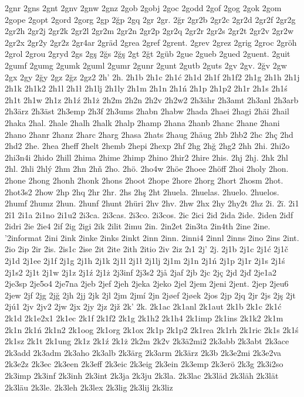 2gnr
2gns
2gnt
2gnv
2gnw
2gnz
2gob
2gobj
2goc
2godd
2gof
2gog
2gok
2gom
2gope
2gopt
2gord
2gorg
2gp
2ğp
2gq
2gr
2gr.
2ğr
2gr2b
2gr2c
2gr2d
2gr2f
2gr2g
2gr2h
2gr2j
2gr2k
2gr2l
2gr2m
2gr2n
2gr2p
2gr2q
2gr2r
2gr2s
2gr2t
2gr2v
2gr2w
2gr2x
2gr2y
2gr2z
2gr4ar
2gräd
2grea
2gref
2grent.
2grev
2grez
2grig
2groc
2gröh
2grol
2grou
2gryd
2gs
2gş
2ğs
2ğş
2gt
2ğt
2güb
2gue
2gueb
2gued
2guent.
2guit
2gumf
2gumg
2gumk
2guml
2gumr
2gunr
2gunt
2gutb
2guts
2gv
2gv.
2ğv
2gw
2gx
2gy
2ğy
2gz
2ğz
2gz2
2h'
2h.
2h1b
2h1c
2h1ć
2h1d
2h1f
2h1f2
2h1g
2h1h
2h1j
2h1k
2h1k2
2h1l
2h1ł
2h1lj
2h1ly
2h1m
2h1n
2h1ń
2h1p
2h1p2
2h1r
2h1s
2h1ś
2h1t
2h1w
2h1z
2h1ź
2h1ż
2h2m
2h2n
2h2v
2h2w2
2h3ähr
2h3amt
2h3anl
2h3arb
2h3ärz
2h3äst
2h3emp
2h3f
2h3ums
2habn
2habw
2hada
2haei
2hagi
2häi
2hail
2haka
2hal.
2hale
2halh
2halk
2halp
2hamp
2hana
2hanb
2hanc
2hane
2hani
2hano
2hanr
2hanz
2harc
2harg
2hasa
2hats
2haug
2häug
2hb
2hb2
2hc
2hç
2hd
2hd2
2he.
2hea
2heff
2helt
2hemb
2hepi
2hexp
2hf
2hg
2hğ
2hg2
2hh
2hi.
2hi2o
2hi3n4i
2hido
2hill
2hima
2hime
2himp
2hino
2hir2
2hire
2his.
2hj
2hj.
2hk
2hl
2hl.
2hli
2hlý
2hm
2hn
2hň
2ho.
2hö.
2ho4w
2höe
2hoee
2höff
2hoi
2holy
2hon.
2hone
2hong
2honh
2honk
2hons
2hoot
2hope
2hore
2horg
2hort
2hosm
2hot.
2hot3s2
2how
2hp
2hq
2hr
2hr.
2hs
2hş
2ht
2huela.
2huelas.
2huelo.
2huelos.
2humf
2humz
2hun.
2hunf
2hunt
2hüri
2hv
2hv.
2hw
2hx
2hy
2hy2t
2hz
2i.
2ï.
2i1
2î1
2i1a
2i1no
2i1u2
2i3ca.
2i3cas.
2i3co.
2i3cos.
2ic
2ici
2id
2ida
2ide.
2iden
2idf
2idri
2ie
2ie4
2if
2ig
2igi
2ik
2ilit
2imu
2in.
2in2et
2in3ta
2in4th
2ine
2ine.
'2informat
2ini
2ink
2inke
2inks
2inkt
2inn
2inn.
2inni4
2innl
2inns
2ino
2ins
2int.
2io
2ip
2ir
2is.
2is1c
2ise
2it
2ite
2ith
2itio
2iv
2iz
2ı1
2j'
2j.
2j1b
2j1c
2j1ć
2j1č
2j1d
2j1ee
2j1f
2j1g
2j1h
2j1k
2j1l
2j1ł
2j1lj
2j1m
2j1n
2j1ń
2j1p
2j1r
2j1s
2j1ś
2j1s2
2j1t
2j1w
2j1z
2j1ź
2j1ż
2j3inf
2j3s2
2jå
2jaf
2jb
2jc
2jç
2jd
2jď
2je1a2
2je3sp
2je5o4
2je7na
2jeb
2jef
2jeh
2jeka
2jeko
2jel
2jem
2jeni
2jent.
2jep
2jeu6
2jew
2jf
2jg
2jğ
2jh
2jj
2jk
2jl
2jm
2jmí
2jn
2jøef
2jøek
2jos
2jp
2jq
2jr
2js
2jş
2jt
2jú1
2jv
2jv2
2jw
2jx
2jy
2jz
2jž
2k'
2k.
2k1ac
2k1anl
2k1aut
2k1b
2k1c
2k1ć
2k1d
2k1e2x1
2k1ec
2k1f
2k1f2
2k1g
2k1h2
2k1h4
2k1imp
2k1ins
2k1k2
2k1m
2k1n
2k1ń
2k1n2
2k1oog
2k1org
2k1ox
2k1p
2k1p2
2k1rea
2k1rh
2k1ric
2k1s
2k1ś
2k1sz
2k1t
2k1ung
2k1z
2k1ź
2k1ż
2k2m
2k2v
2k3ä2mi2
2k3abb
2k3abt
2k3ace
2k3add
2k3adm
2k3aho
2k3alb
2k3ärg
2k3arm
2k3ärz
2k3b
2k3e2mi
2k3e2va
2k3e2z
2k3ec
2k3een
2k3eff
2k3eic
2k3eig
2k3ein
2k3emp
2k3erö
2k3g
2k3i2so
2k3imp
2k3inf
2k3inh
2k3int
2k3ja
2k3ju
2k3la.
2k3lac
2k3läd
2k3läh
2k3lät
2k3läu
2k3le.
2k3leh
2k3lex
2k3lig
2k3lij
2k3liz
